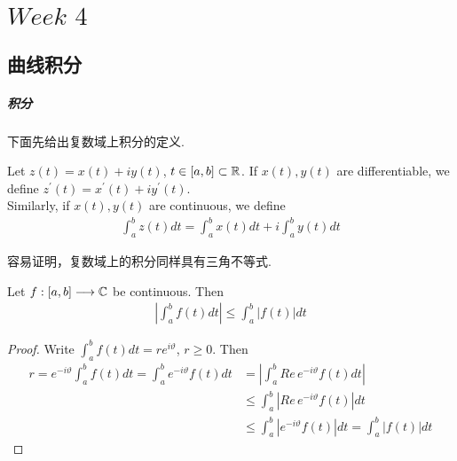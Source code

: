 \ifx\allfiles\undefined


	\else
	\fi

\chapter{$Week \,\, 4$}
\section{曲线积分}
\paragraph{积分}
下面先给出复数域上积分的定义.
\begin{defn}\label{def 4.1.1}
	Let $z(t) = x(t) + i y(t)$, $t \in [a , b] \subset \mathbb{R}$. If $x(t) , y(t)$ are differentiable, we define $z^{'}(t) = x^{'}(t) + i y^{'}(t)$.\\
	Similarly, if $x(t) , y(t)$ are continuous, we define
	\begin{align}
		\int_{a}^{b}{z(t) dt} = \int_{a}^{b}{x(t) dt} + i \int_{a}^{b}{y(t) dt}
	\end{align}
\end{defn}

\vspace{2em}
容易证明，复数域上的积分同样具有三角不等式.
\begin{proposition}\label{prop 4.1.1}
	Let $f : [a , b] \longrightarrow \mathbb{C}$ be continuous. Then 
	\begin{align}
		\left| \int_{a}^{b}{f(t) dt} \right| \leq \int_{a}^{b}{\left| f(t) \right| dt}
	\end{align}
	
	\vspace{2em}
	\begin{proof}
		Write $\int_{a}^{b}{f(t) dt} = r e^{i\vartheta}$, $r \geq 0$. Then
		\begin{align}
			r = e^{-i\vartheta} \int_{a}^{b}{f(t) dt} = \int_{a}^{b}{e^{-i\vartheta} f(t) dt} 
			&= \left| \int_{a}^{b}{Re \, e^{-i\vartheta} f(t) dt} \right| \\
			&\leq \int_{a}^{b}{\left| Re \, e^{-i\vartheta} f(t) \right| dt} \\
			&\leq \int_{a}^{b}{\left| e^{-i\vartheta} f(t) \right| dt} = \int_{a}^{b}{\left| f(t) \right| dt}
		\end{align}
	\end{proof}
\end{proposition}

